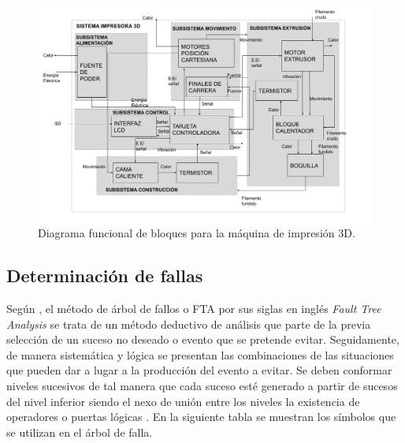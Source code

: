 \begin{figure}[H]
\centering
\includegraphics[scale=0.4]{images/diagramafuncional.png}
\caption{Diagrama funcional de bloques para la máquina de impresión 3D.}
\end{figure}

\subsection{Determinación de fallas}
 
Según \cite{pique1998}, el método de árbol de fallos o FTA por sus siglas en inglés \textit{Fault Tree Analysis} se trata de un método deductivo de análisis que parte de la previa selección de un suceso no deseado o evento que se pretende evitar. Seguidamente, de manera sistemática y lógica se presentan las combinaciones de las situaciones que pueden dar a lugar a la producción del evento a evitar. Se deben conformar niveles sucesivos de tal manera que cada suceso esté generado a partir de sucesos del nivel inferior siendo el nexo de unión entre los niveles la existencia de operadores o puertas lógicas \citep{pique1998}. En la siguiente tabla se muestran los símbolos que se utilizan en el árbol de falla.
 
